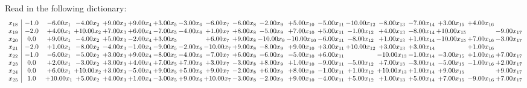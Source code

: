 \documentclass[9pt]{article}
\begin{document}
Read in the following dictionary:
\[\begin{array}{c| c c@{\hskip 2pt} c@{\hskip 2pt} c@{\hskip 2pt} c@{\hskip 2pt} c@{\hskip 2pt} c@{\hskip 2pt} c@{\hskip 2pt} c@{\hskip 2pt} c@{\hskip 2pt} c@{\hskip 2pt} c@{\hskip 2pt} c@{\hskip 2pt} c@{\hskip 2pt} c@{\hskip 2pt} c@{\hskip 2pt} c@{\hskip 2pt} c@{\hskip 2pt} }
 x_{18}   &  -1.0 & -6.00 x_{1} & -4.00 x_{2} & +  9.00 x_{3} & +  9.00 x_{4} & +  3.00 x_{5} & -3.00 x_{6} & -6.00 x_{7} & -6.00 x_{8} & -2.00 x_{9} & +  5.00 x_{10} & -5.00 x_{11} & -10.00 x_{12} & -8.00 x_{13} & -7.00 x_{14} & +  3.00 x_{15} & +  4.00 x_{16} &   \\
 x_{19}   &  -2.0 & +  4.00 x_{1} & + 10.00 x_{2} & +  7.00 x_{3} & +  6.00 x_{4} & -7.00 x_{5} & -4.00 x_{6} & +  1.00 x_{7} & +  8.00 x_{8} & -5.00 x_{9} & +  7.00 x_{10} & +  5.00 x_{11} & -1.00 x_{12} & +  4.00 x_{13} & -8.00 x_{14} & + 10.00 x_{15} &   & -9.00 x_{17}\\
 x_{20}   &  0.0 & +  9.00 x_{1} & -4.00 x_{2} & +  5.00 x_{3} & -2.00 x_{4} & +  3.00 x_{5} &   & +  6.00 x_{7} & +  9.00 x_{8} & -10.00 x_{9} & -10.00 x_{10} & -6.00 x_{11} & -8.00 x_{12} & +  1.00 x_{13} & +  1.00 x_{14} & -10.00 x_{15} & +  7.00 x_{16} & -3.00 x_{17}\\
 x_{21}   &  -2.0 & +  1.00 x_{1} & -8.00 x_{2} & -4.00 x_{3} & -1.00 x_{4} & -9.00 x_{5} & -2.00 x_{6} & -10.00 x_{7} & +  9.00 x_{8} & -8.00 x_{9} & +  9.00 x_{10} & +  3.00 x_{11} & + 10.00 x_{12} & +  3.00 x_{13} & +  3.00 x_{14} &   & +  1.00 x_{16} &   \\
 x_{22}   &  -1.0 & -6.00 x_{1} & -5.00 x_{2} & +  3.00 x_{3} & +  9.00 x_{4} & -8.00 x_{5} & -4.00 x_{6} & -7.00 x_{7} & +  6.00 x_{8} & -6.00 x_{9} & -5.00 x_{10} & +  6.00 x_{11} &   & -10.00 x_{13} & -1.00 x_{14} & -3.00 x_{15} & +  1.00 x_{16} & +  7.00 x_{17}\\
 x_{23}   &  0.0 & +  2.00 x_{1} & -3.00 x_{2} & +  3.00 x_{3} & +  4.00 x_{4} & +  7.00 x_{5} & +  7.00 x_{6} & +  3.00 x_{7} & -3.00 x_{8} & +  8.00 x_{9} & +  1.00 x_{10} & -9.00 x_{11} & -5.00 x_{12} & +  7.00 x_{13} & -3.00 x_{14} & -5.00 x_{15} & -1.00 x_{16} & +  2.00 x_{17}\\
 x_{24}   &  0.0 & +  6.00 x_{1} & + 10.00 x_{2} & +  3.00 x_{3} & -5.00 x_{4} & +  9.00 x_{5} & +  5.00 x_{6} & +  9.00 x_{7} & -2.00 x_{8} & +  6.00 x_{9} & +  8.00 x_{10} & -1.00 x_{11} & +  1.00 x_{12} & + 10.00 x_{13} & +  1.00 x_{14} & +  9.00 x_{15} &   & +  9.00 x_{17}\\
 x_{25}   &  1.0 & + 10.00 x_{1} & +  5.00 x_{2} & +  4.00 x_{3} & +  1.00 x_{4} & -3.00 x_{5} & +  9.00 x_{6} & + 10.00 x_{7} & -3.00 x_{8} & -2.00 x_{9} & +  9.00 x_{10} & -4.00 x_{11} & +  5.00 x_{12} & +  1.00 x_{13} & +  5.00 x_{14} & +  7.00 x_{15} & -9.00 x_{16} & +  7.00 x_{17}\\

\end{array}\]
\end{document}
